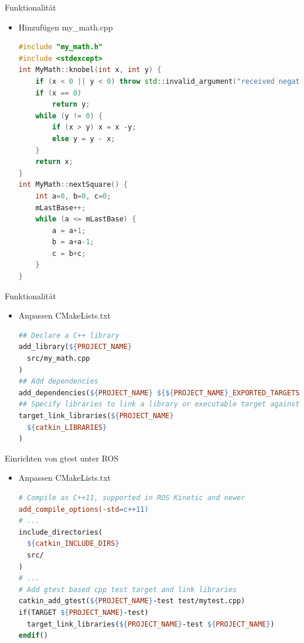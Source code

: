 \documentclass{beamer}
\begin{document}
\begin{frame}[fragile]{Funktionalität}
\begin{itemize}
\item Hinzufügen my\_math.cpp
\begin{lstlisting}[language=c++]
#include "my_math.h"
#include <stdexcept>
int MyMath::knobel(int x, int y) {
	if (x < 0 || y < 0) throw std::invalid_argument("received negative value");
	if (x == 0)
		return y;
	while (y != 0) {
		if (x > y) x = x -y;
		else y = y - x;
	}
	return x;
}
int MyMath::nextSquare() {
	int a=0, b=0, c=0;
	mLastBase++;
	while (a <= mLastBase) {
		a = a+1;
		b = a+a-1;
		c = b+c;
	}
}
\end{lstlisting}
\end{itemize}
\end{frame}

\begin{frame}[fragile]{Funktionalität}
\begin{itemize}
\item Anpassen CMakeLists.txt
\begin{lstlisting}[language=make]
## Declare a C++ library
add_library(${PROJECT_NAME}
  src/my_math.cpp
)
## Add dependencies
add_dependencies(${PROJECT_NAME} ${${PROJECT_NAME}_EXPORTED_TARGETS} ${catkin_EXPORTED_TARGETS})
## Specify libraries to link a library or executable target against
target_link_libraries(${PROJECT_NAME}
  ${catkin_LIBRARIES}
)
\end{lstlisting}
\end{itemize}
\end{frame}

\begin{frame}[fragile]{Einrichten von gtest unter ROS}
\begin{itemize}
\item Anpassen CMakeLists.txt
\begin{lstlisting}[language=make]
# Compile as C++11, supported in ROS Kinetic and newer
add_compile_options(-std=c++11)
# ...
include_directories(
  ${catkin_INCLUDE_DIRS}
  src/
)
# ...
# Add gtest based cpp test target and link libraries
catkin_add_gtest(${PROJECT_NAME}-test test/mytest.cpp)
if(TARGET ${PROJECT_NAME}-test)
  target_link_libraries(${PROJECT_NAME}-test ${PROJECT_NAME})
endif()
\end{lstlisting}
\end{itemize}
\end{frame}
\end{document}
